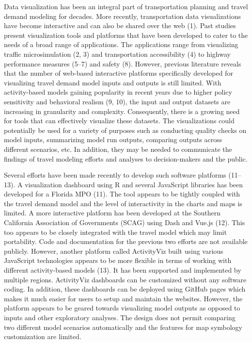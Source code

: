 \documentclass[3p,times,procedia]{elsarticle}
\begin{document}
Data visualization has been an integral part of transportation planning and travel demand modeling for decades. More recently, transportation data visualizations have become interactive and can also be shared over the web (1). Past studies present visualization tools and platforms that have been developed to cater to the needs of a broad range of applications. The applications range from visualizing traffic microsimulation (2, 3) and transportation accessibility (4) to highway performance measures (5–7) and safety (8). However, previous literature reveals that the number of web-based interactive platforms specifically developed for visualizing travel demand model inputs and outputs is still limited. With activity-based models gaining popularity in recent years due to higher policy sensitivity and behavioral realism (9, 10), the input and output datasets are increasing in granularity and complexity. Consequently, there is a growing need for tools that can effectively visualize these datasets. The visualizations could potentially be used for a variety of purposes such as conducting quality checks on model inputs, summarizing model run outputs, comparing outputs across different scenarios, etc. In addition, they may be needed to communicate the findings of travel modeling efforts and analyses to decision-makers and the public.

Several efforts have been made recently to develop such software platforms (11–13). A visualization dashboard using R and several JavaScript libraries has been developed for a Florida MPO (11). The tool appears to be tightly coupled with the travel demand model and the level of interactivity in the charts and maps is limited. A more interactive platform has been developed at the Southern California Association of Governments (SCAG) using Dash and Vue.js (12). This too appears to be closely integrated with the travel model which may limit portability. Code and documentation for the previous two efforts are not available publicly. However, another platform called ActivityViz built using various JavaScript technologies appears to be more flexible in terms of working with different activity-based models (13). It has been supported and implemented by multiple regions. ActivityViz dashboards can be customized without any software coding. In addition, these dashboards can be deployed using GitHub pages which makes it much easier for users to setup and maintain the websites. However, the platform appears to be geared towards visualizing model outputs as opposed to inputs and other exploratory analyses. The design does not permit comparing two different model scenarios automatically and the features for map symbology customization are limited.
\end{document}
